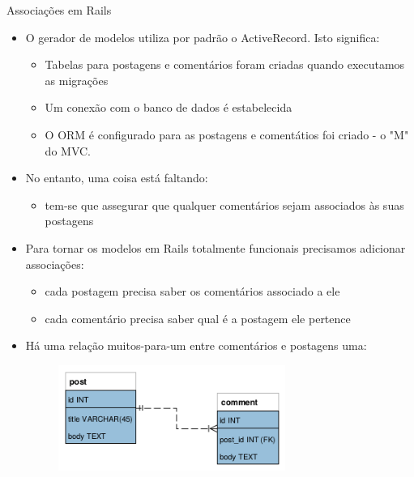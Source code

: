 \begin{frame}{Associações em Rails}
	\begin{itemize}
		\item O gerador de modelos utiliza por padrão o ActiveRecord. Isto significa:
		\begin{itemize}
			\item Tabelas para postagens e comentários foram criadas quando executamos as migrações
			\item Um conexão com o banco de dados é estabelecida
			\item O ORM é configurado para as postagens e comentátios foi criado - o "M" do
			MVC.
		\end{itemize}

		\item No entanto, uma coisa está faltando:
		\begin{itemize}
			\item  \alert{tem-se que assegurar que qualquer
				comentários sejam associados às suas postagens}
		\end{itemize}

		\item Para tornar os modelos em Rails totalmente funcionais precisamos adicionar
		\alert{associações}:
		\begin{itemize}
			\item cada postagem precisa saber os comentários associado a ele
			\item cada comentário precisa saber qual é a postagem ele pertence
		\end{itemize}
	
		\item Há uma relação \alert{muitos-para-um} entre comentários e postagens
		uma:
		\begin{figure}[h!]
			\centering
			\includegraphics[width=0.70\textwidth]{imagens/modelo-de-dados-blog.png}
		\end{figure}
		

\end{itemize}
\end{frame}
